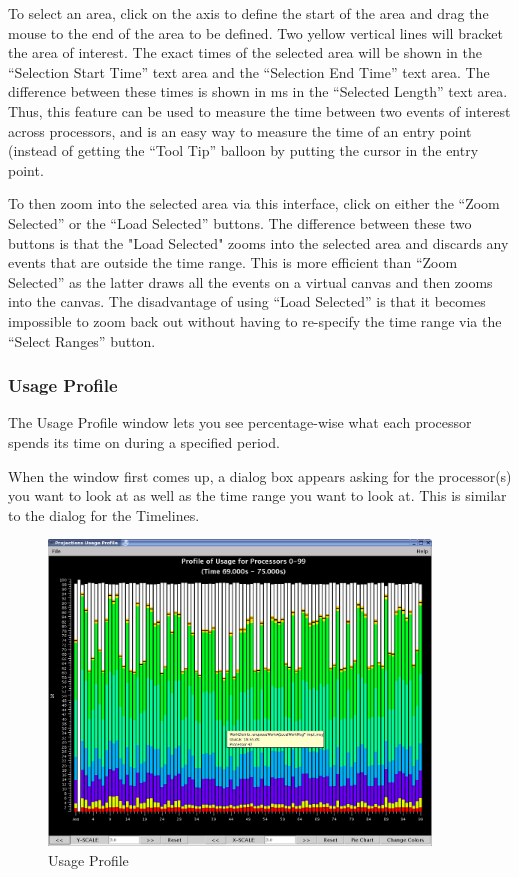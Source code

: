 \documentclass[10pt]{article}
\begin{document}
To select an area, click on the axis to define the start of the area
and drag the mouse to the end of the area to be defined.  Two yellow
vertical lines will bracket the area of interest.  The exact times of
the selected area will be shown in the ``Selection Start Time'' text
area and the ``Selection End Time'' text area.  The difference between
these times is shown in ms in the ``Selected Length'' text area.  Thus,
this feature can be used to measure the time between two events of
interest across processors, and is an easy way to measure the time of
an entry point (instead of getting the ``Tool Tip'' balloon by putting
the cursor in the entry point.

To then zoom into the selected area via this interface, click on
either the ``Zoom Selected'' or the ``Load Selected'' buttons.  The
difference between these two buttons is that the "Load Selected" zooms
into the selected area and discards any events that are outside the
time range.  This is more efficient than ``Zoom Selected'' as the
latter draws all the events on a virtual canvas and then zooms into
the canvas. The disadvantage of using ``Load Selected'' is that it
becomes impossible to zoom back out without having to re-specify the
time range via the ``Select Ranges'' button.

\subsubsection{Usage Profile}

The Usage Profile window lets you see percentage-wise what each processor
spends its time on during a specified period.

When the window first comes up, a dialog box appears asking for the
processor(s) you want to look at as well as the time range you want to
look at.  This is similar to the dialog for the Timelines.

\begin{figure}[htb]
\center
\includegraphics[width=4.0in]{fig/usageprofile}
\caption{Usage Profile}
\label{usage profile}
\end{figure}
\end{document}
